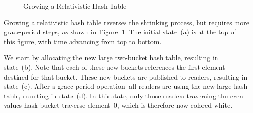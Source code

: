 \begin{figure}
\centering
{}
\caption{Growing a Relativistic Hash Table}
\label{fig:datastruct:Growing a Relativistic Hash Table}
\end{figure}

Growing a relativistic hash table reverses the shrinking process,
but requires more grace-period steps, as shown in
Figure~\ref{fig:datastruct:Growing a Relativistic Hash Table}.
The initial state~(a) is at the top of this figure, with time advancing
from top to bottom.

We start by allocating the new large two-bucket hash table, resulting
in state~(b).
Note that each of these new buckets references the first element destined
for that bucket.
These new buckets are published to readers, resulting in state~(c).
After a grace-period operation, all readers are using the new large
hash table, resulting in state~(d).
In this state, only those readers traversing the even-values hash bucket
traverse element~0, which is therefore now colored white.

